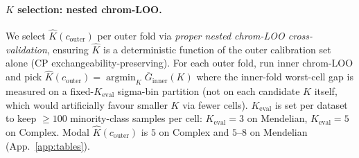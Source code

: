 \paragraph{$K$ selection: nested chrom-LOO.}
We select $\hat K(c_{\mathrm{outer}})$ per outer fold via \emph{proper nested chrom-LOO cross-validation}, ensuring $\hat K$ is a deterministic function of the outer calibration set alone (CP exchangeability-preserving). For each outer fold, run inner chrom-LOO and pick $\hat K(c_{\mathrm{outer}}) = \operatorname{argmin}_K \overline G_{\mathrm{inner}}(K)$ where the inner-fold worst-cell gap is measured on a fixed-$K_{\mathrm{eval}}$ sigma-bin partition (not on each candidate $K$ itself, which would artificially favour smaller $K$ via fewer cells). $K_{\mathrm{eval}}$ is set per dataset to keep $\geq 100$ minority-class samples per cell: $K_{\mathrm{eval}} = 3$ on Mendelian, $K_{\mathrm{eval}} = 5$ on Complex. Modal $\hat K(c_{\mathrm{outer}})$ is $5$ on Complex and $5\text{--}8$ on Mendelian (App.~\ref{app:tables}).
